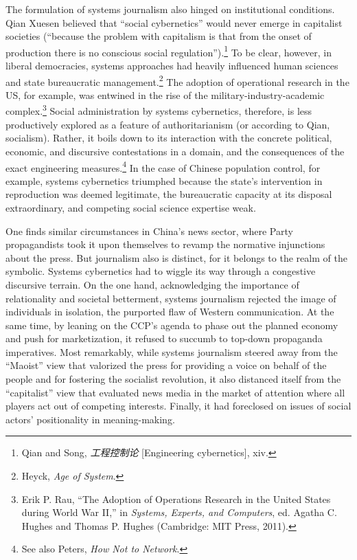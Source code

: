 \documentclass{tufte-handout}
\begin{document}
\begin{CJK*}{UTF8}{gbsn}
The formulation of systems journalism also hinged on institutional
conditions. Qian Xuesen believed that ``social cybernetics'' would never
emerge in capitalist societies (``because the problem with capitalism is
that from the onset of production there is no conscious social
regulation'').\footnote{Qian and Song, \emph{工程控制论} {[}Engineering
  cybernetics{]}, xiv.} To be clear, however, in liberal democracies,
systems approaches had heavily influenced human sciences and state
bureaucratic management.\footnote{Heyck, \emph{Age of System}.} The
adoption of operational research in the US, for example, was entwined in
the rise of the military-industry-academic complex.\footnote{Erik P.
  Rau, ``The Adoption of Operations Research in the United States during
  World War II,'' in \emph{Systems, Experts, and Computers}, ed. Agatha
  C. Hughes and Thomas P. Hughes (Cambridge: MIT Press, 2011).} Social
administration by systems cybernetics, therefore, is less productively
explored as a feature of authoritarianism (or according to Qian,
socialism). Rather, it boils down to its interaction with the concrete
political, economic, and discursive contestations in a domain, and the
consequences of the exact engineering measures.\footnote{See also
  Peters, \emph{How Not to Network}.} In the case of Chinese population
control, for example, systems cybernetics triumphed because the state's
intervention in reproduction was deemed legitimate, the bureaucratic
capacity at its disposal extraordinary, and competing social science
expertise weak.

One finds similar circumstances in China's news sector, where Party
propagandists took it upon themselves to revamp the normative
injunctions about the press. But journalism also is distinct, for it
belongs to the realm of the symbolic. Systems cybernetics had to wiggle
its way through a congestive discursive terrain. On the one hand,
acknowledging the importance of relationality and societal betterment,
systems journalism rejected the image of individuals in isolation, the
purported flaw of Western communication. At the same time, by leaning on
the CCP's agenda to phase out the planned economy and push for
marketization, it refused to succumb to top-down propaganda imperatives.
Most remarkably, while systems journalism steered away from the
``Maoist'' view that valorized the press for providing a voice on behalf
of the people and for fostering the socialist revolution, it also
distanced itself from the ``capitalist'' view that evaluated news media
in the market of attention where all players act out of competing
interests. Finally, it had foreclosed on issues of social actors'
positionality in meaning-making.


\end{CJK*}
\end{document}
